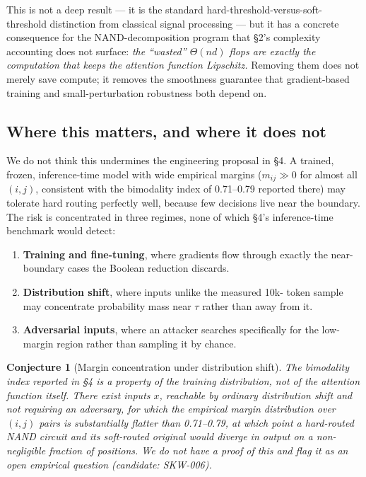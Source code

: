 \documentclass[11pt]{article}
\newtheorem{conjecture}[theorem]{Conjecture}
\theoremstyle{definition}
\begin{document}
This is not a deep result --- it is the standard hard-threshold-versus-soft-
threshold distinction from classical signal processing --- but it has a
concrete consequence for the NAND-decomposition program that \S2's
complexity accounting does not surface: \emph{the ``wasted'' $\Theta(nd)$
flops are exactly the computation that keeps the attention function
Lipschitz.} Removing them does not merely save compute; it removes the
smoothness guarantee that gradient-based training and small-perturbation
robustness both depend on.

\subsection{Where this matters, and where it does not}

We do not think this undermines the engineering proposal in \S4. A trained,
frozen, inference-time model with wide empirical margins ($m_{ij} \gg 0$ for
almost all $(i,j)$, consistent with the bimodality index of 0.71--0.79
reported there) may tolerate hard routing perfectly well, because few
decisions live near the boundary. The risk is concentrated in three regimes,
none of which \S4's inference-time benchmark would detect:

\begin{enumerate}
  \item \textbf{Training and fine-tuning}, where gradients flow through
    exactly the near-boundary cases the Boolean reduction discards.
  \item \textbf{Distribution shift}, where inputs unlike the measured 10k-
    token sample may concentrate probability mass near $\tau$ rather than
    away from it.
  \item \textbf{Adversarial inputs}, where an attacker searches specifically
    for the low-margin region rather than sampling it by chance.
\end{enumerate}

\begin{conjecture}[Margin concentration under distribution shift]
\label{conj:shift}
The bimodality index reported in \S4 is a property of the training
distribution, not of the attention function itself. There exist inputs
$x$, reachable by ordinary distribution shift and not requiring an
adversary, for which the empirical margin distribution over $(i,j)$ pairs
is substantially flatter than 0.71--0.79, at which point a hard-routed
NAND circuit and its soft-routed original would diverge in output on a
non-negligible fraction of positions. We do not have a proof of this and
flag it as an open empirical question (candidate: SKW-006).
\end{conjecture}
\end{document}
